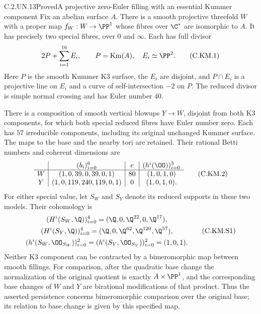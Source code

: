 \begin{statement}{C.2.UN.13}{Proved}{A projective zero-Euler filling with an essential Kummer component}
Fix an abelian surface $A$. There is a smooth projective threefold
$W$ with a proper map $f_W:W\to\PP^1$ whose fibres over
$\C^*$ are isomorphic to $A$. It has precisely two special fibres,
over $0$ and $\infty$. Each has full divisor
\[
               2P+\sum_{i=1}^{16}E_i,\qquad
 P=\operatorname{Km}(A),\quad E_i\simeq\PP^2.       \tag{C.KM.1}
\]
Here $P$ is the smooth Kummer K3 surface, the $E_i$ are disjoint,
and $P\cap E_i$ is a projective line on $E_i$ and a curve of
self-intersection $-2$ on $P$. The reduced divisor is simple
normal crossing and has Euler number $40$.

There is a composition of smooth vertical blowups $Y\to W$,
disjoint from both K3 components, for which both special reduced
fibres have Euler number zero. Each has $57$ irreducible
components, including its original unchanged Kummer surface.
The maps to the base and the nearby tori are retained. Their
rational Betti numbers and coherent dimensions are
\[
 \begin{array}{c|c|c|c}
 & (b_i)_{i=0}^6 & e & (h^i(\OO))_{i=0}^3\\ \hline
 W&(1,0,39,0,39,0,1)&80&(1,0,1,0)\\
 Y&(1,0,119,240,119,0,1)&0&(1,0,1,0).
 \end{array}                                             \tag{C.KM.2}
\]
For either special value, let $S_W$ and $S_Y$ denote its
reduced supports in these two models. Their cohomology is
\[
 \begin{gathered}
 (H^i(S_W,\Q))_{i=0}^4=(\Q,0,\Q^{22},0,\Q^{17}),\\
 (H^i(S_Y,\Q))_{i=0}^4=(\Q,0,\Q^{62},\Q^{120},\Q^{57}),\\
 (h^i(S_W,\OO_{S_W}))_{i=0}^2
   =(h^i(S_Y,\OO_{S_Y}))_{i=0}^2=(1,0,1).
 \end{gathered}                                          \tag{C.KM.S1}
\]
Neither K3 component can be contracted by a bimeromorphic map
between smooth fillings. For comparison, after the quadratic
base change the normalization of the original quotient is
exactly $A\times\PP^1$, and the corresponding base changes
of $W$ and $Y$ are birational modifications of that product.
Thus the asserted persistence concerns bimeromorphic comparison
over the original base; its relation to base change is given
by this specified map.
\end{statement}
